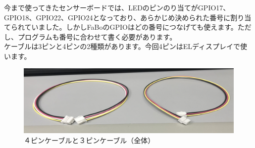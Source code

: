 今まで使ってきたセンサーボードでは、LEDのピンのり当てがGPIO17、GPIO18、GPIO22、GPIO24となっており、あらかじめ決められた番号に割り当てられていました。しかしFaBoのGPIOはどの番号につなげても使えます。ただし、プログラムも番号に合わせて書く必要があります。\\
ケーブルは3ピンと4ピンの2種類があります。今回4ピンはELディスプレイで使います。\\
\begin{figure}[h]
  \begin{center}
    \includegraphics[scale=0.6]{images/chap05/text05-img013.png}
    \caption{４ピンケーブルと３ピンケーブル（全体）}
  \end{center}
\end{figure}
